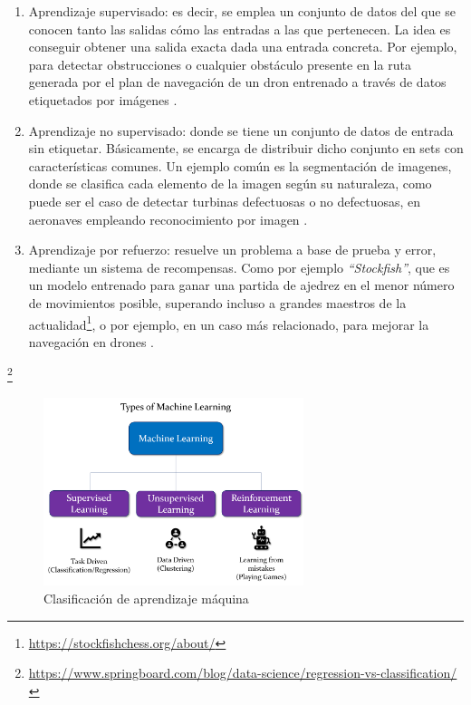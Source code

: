\begin{enumerate}
	\item Aprendizaje supervisado: es decir, se emplea un conjunto de datos del que se conocen tanto las salidas cómo las entradas a las que pertenecen. La idea es conseguir obtener una salida exacta dada una entrada concreta. Por ejemplo, para detectar obstrucciones o cualquier obstáculo presente en la ruta generada por el plan de navegación de un dron entrenado a través de datos etiquetados por imágenes \cite{christl2020visionbased}.
	\item Aprendizaje no supervisado: donde se tiene un conjunto de datos de entrada sin etiquetar. Básicamente, se encarga de distribuir dicho conjunto en sets con características comunes. Un ejemplo común es la segmentación de imagenes, donde se clasifica cada elemento de la imagen según su naturaleza, como puede ser el caso de detectar turbinas defectuosas o no defectuosas, en aeronaves empleando reconocimiento por imagen \cite{wang2019unsupervised}.
    \item Aprendizaje por refuerzo: resuelve un problema a base de prueba y error, mediante un sistema de recompensas. Como por ejemplo \emph{``Stockfish''}, que es un modelo entrenado para ganar una partida de ajedrez en el menor número de movimientos posible, superando incluso a grandes maestros de la actualidad\footnote[16]{\url{https://stockfishchess.org/about/}}, o por ejemplo, en un caso más relacionado, para mejorar la navegación en drones \cite{electronics10090999}.
\end{enumerate}\footnote[17]{\url{https://www.springboard.com/blog/data-science/regression-vs-classification/}}

\begin{figure} [tp]
	\begin{center}
	\includegraphics[height=5.5cm]{imagenes/cap1/8_AI_types.png}
	\end{center}
	\caption[Clasificación de aprendizaje máquina]{Clasificación de aprendizaje máquina}
	\label{fig:ai_types}
\end{figure}

